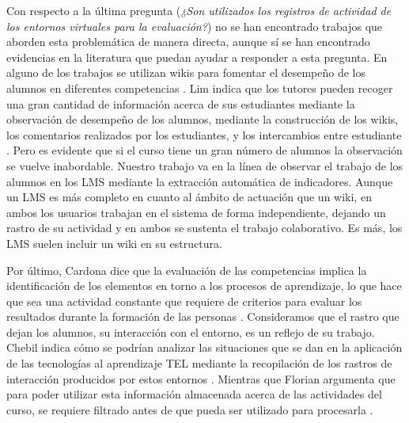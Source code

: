 Con respecto a la última pregunta (\emph{¿Son utilizados los registros de actividad de los entornos virtuales para la evaluación?}) no se han encontrado trabajos que aborden esta problemática de manera directa, aunque sí se han encontrado evidencias en la literatura que puedan ayudar a responder a esta pregunta. En alguno de los trabajos se utilizan wikis para fomentar el desempeño de los alumnos en diferentes competencias \cite{Piedra:2010}. Lim indica que los tutores pueden recoger una gran cantidad de información acerca de sus estudiantes mediante la observación de desempeño de los alumnos, mediante la construcción de los wikis, los comentarios realizados por los estudiantes, y los intercambios entre estudiante \cite{Lim:2011}. Pero es evidente que si el curso tiene un gran número de alumnos la observación se vuelve inabordable. Nuestro trabajo va en la línea de observar el trabajo de los alumnos en los LMS mediante la extracción automática de indicadores. Aunque un LMS es más completo en cuanto al ámbito de actuación que un wiki, en ambos los usuarios trabajan en el sistema de forma independiente, dejando un rastro de su actividad y en ambos se sustenta el trabajo colaborativo. Es más, los LMS suelen incluir un wiki en su estructura. 

Por último, Cardona dice que la evaluación de las competencias implica la identificación de los elementos en torno a los procesos de aprendizaje, lo que hace que sea una actividad constante que requiere de criterios para evaluar los resultados durante la formación de las personas \cite{Cardona:2013}. Consideramos que el rastro que dejan los alumnos, su interacción con el entorno, es un reflejo de su trabajo. Chebil indica cómo se podrían analizar las situaciones que se dan en la aplicación de las tecnologías al aprendizaje TEL mediante la recopilación de los rastros de interacción producidos por estos entornos \cite{Chebil:2012}. Mientras que Florian argumenta que para poder utilizar esta información almacenada acerca de las actividades del curso, se requiere filtrado antes de que pueda ser utilizado para procesarla \cite{Florian:2011}.

